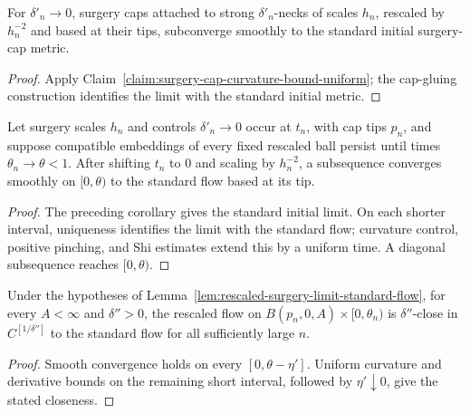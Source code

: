 \begin{corollary}
\label{cor:surgery-cap-smooth-limit}
For $\delta'_n\to0$, surgery caps attached to strong $\delta'_n$-necks of scales $h_n$, rescaled by $h_n^{-2}$ and based at their tips, subconverge smoothly to the standard initial surgery-cap metric.
\end{corollary}
\begin{proof}
\sketch Apply Claim~\ref{claim:surgery-cap-curvature-bound-uniform}; the cap-gluing construction identifies the limit with the standard initial metric.
\end{proof}

\begin{lemma}
\label{lem:rescaled-surgery-limit-standard-flow}
Let surgery scales $h_n$ and controls $\delta'_n\to0$ occur at $t_n$, with cap tips $p_n$, and suppose compatible embeddings of every fixed rescaled ball persist until times $\theta_n\to\theta<1$. After shifting $t_n$ to $0$ and scaling by $h_n^{-2}$, a subsequence converges smoothly on $[0,\theta)$ to the standard flow based at its tip.
\end{lemma}
\begin{proof}
\sketch
{}
The preceding corollary gives the standard initial limit. On each shorter interval, uniqueness identifies the limit with the standard flow; curvature control, positive pinching, and Shi estimates extend this by a uniform time. A diagonal subsequence reaches $[0,\theta)$.
\end{proof}

\begin{corollary}
\label{cor:surgery-cap-close-to-standard-up-to-theta}\label{goodtotheta}
Under the hypotheses of Lemma~\ref{lem:rescaled-surgery-limit-standard-flow}, for every $A<\infty$ and $\delta''>0$, the rescaled flow on $B(p_n,0,A)\times[0,\theta_n)$ is $\delta''$-close in $C^{[1/\delta'']}$ to the standard flow for all sufficiently large $n$.
\end{corollary}
\begin{proof}
\sketch
{}
Smooth convergence holds on every $[0,\theta-\eta']$. Uniform curvature and derivative bounds on the remaining short interval, followed by $\eta'\downarrow0$, give the stated closeness.
\end{proof}

